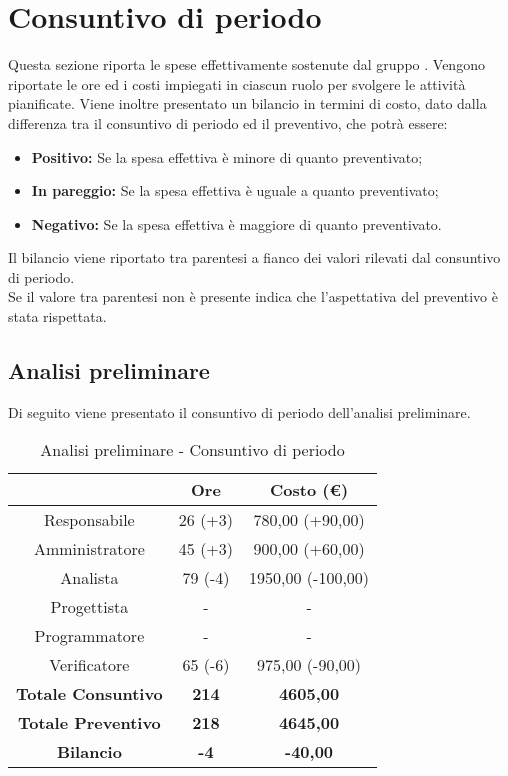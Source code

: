 \section{Consuntivo di periodo} \label{section:consuntivo}
Questa sezione riporta le spese effettivamente sostenute dal gruppo \groupName.
Vengono riportate le ore ed i costi impiegati in ciascun ruolo per svolgere le attività pianificate.
Viene inoltre presentato un bilancio in termini di costo, dato dalla differenza tra il consuntivo di periodo ed il preventivo, che potrà essere:
\begin{itemize}
    \item \textbf{Positivo:} Se la spesa effettiva è minore di quanto preventivato;
    \item \textbf{In pareggio:} Se la spesa effettiva è uguale a quanto preventivato;
    \item \textbf{Negativo:} Se la spesa effettiva è maggiore di quanto preventivato.
\end{itemize}
Il bilancio viene riportato tra parentesi a fianco dei valori rilevati dal consuntivo di periodo. 
\\Se il valore tra parentesi non è presente indica che l'aspettativa del preventivo è stata rispettata.
\pagebreak

\subsection{Analisi preliminare} \label{subsection:consuntivo_analisi}
Di seguito viene presentato il consuntivo di periodo dell'analisi preliminare.
\begin{table}[H]
    \centering
    \renewcommand{\arraystretch}{1.8}
    \begin{tabular}{c|c|c}
      \rowcolor[HTML]{125E28} 
      \multicolumn{1}{c}{\color[HTML]{FFFFFF}\textbf{Ruolo}}
      & \multicolumn{1}{c}{\color[HTML]{FFFFFF}\textbf{Ore}}
      & \multicolumn{1}{c}{\color[HTML]{FFFFFF}\textbf{Costo (€)}}\\
      \hline
      Responsabile      & 26 (+3) & 780,00 (+90,00)\\
      Amministratore    & 45 (+3) & 900,00 (+60,00)\\
      Analista          & 79 (-4) & 1950,00 (-100,00)\\
      Progettista       & - & -\\
      Programmatore     & - & -\\
      Verificatore      & 65 (-6) & 975,00 (-90,00)\\
      \textbf{Totale Consuntivo} & \textbf{214} & \textbf{4605,00}\\
      \textbf{Totale Preventivo} & \textbf{218} & \textbf{4645,00}\\
      \textbf{Bilancio} & \textbf{-4} & \textbf{-40,00}\\
    \end{tabular}
    \caption{Analisi preliminare - Consuntivo di periodo}
  \end{table}


